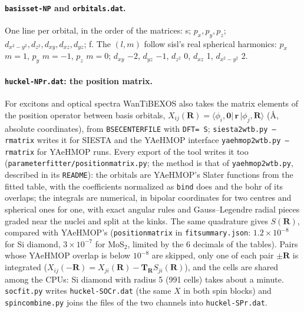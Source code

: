 \documentclass[11pt,a4paper]{article}
\newcommand{\cmd}[1]{\texttt{#1}}
\renewcommand{\_}{\origunderscore\allowbreak}
\begin{document}
\paragraph{\cmd{basis\_set-NP} and \cmd{orbitals.dat}.} One line per orbital, in the order of the matrices:
s; $p_x,p_y,p_z$; $d_{x^2-y^2},d_{z^2},d_{xy},d_{xz},d_{yz}$; f. The $(l,m)$ follow sisl's real spherical
harmonics: $p_x$ $m{=}1$, $p_y$ $m{=}{-1}$, $p_z$ $m{=}0$; $d_{xy}$ $-2$, $d_{yz}$ $-1$, $d_{z^2}$ 0, $d_{xz}$ 1,
$d_{x^2-y^2}$ 2.

\paragraph{\cmd{huckel-NP\_r.dat}: the position matrix.} For excitons and optical spectra WanTiBEXOS also takes the matrix
elements of the position operator between basis orbitals, $X_{ij}(\mathbf R)=\langle\phi_i,\mathbf 0|\,\mathbf r\,|\phi_j,\mathbf R\rangle$
(\AA, absolute coordinates), from \cmd{BSE\_CENTER\_FILE} with \cmd{DFT= S}; \cmd{siesta2wtb.py --rmatrix} writes it for SIESTA and
the YAeHMOP interface \cmd{yaehmop2wtb.py --rmatrix} for YAeHMOP runs. Every export of the tool writes it too
(\cmd{parameter\_fitter/position\_matrix.py}; the method is that of \cmd{yaehmop2wtb.py}, described in its \cmd{README}): the orbitals
are YAeHMOP's Slater functions from the fitted table, with the coefficients normalized as \cmd{bind} does and the bohr of its
overlaps; the integrals are numerical, in bipolar coordinates for two centres and spherical ones for one, with exact angular
rules and Gauss--Legendre radial pieces graded near the nuclei and split at the kinks. The same quadrature gives $S(\mathbf R)$,
compared with YAeHMOP's (\cmd{position\_matrix} in \cmd{fit\_summary.json}: $1.2\times10^{-8}$ for Si diamond, $3\times10^{-7}$ for
MoS$_2$, limited by the 6 decimals of the tables). Pairs whose YAeHMOP overlap is below $10^{-8}$ are skipped, only one of each
pair $\pm\mathbf R$ is integrated ($X_{ij}(-\mathbf R)=X_{ji}(\mathbf R)-\mathbf T_\mathbf R S_{ji}(\mathbf R)$), and the cells are
shared among the CPUs: Si diamond with radius 5 (991 cells) takes about a minute. \cmd{soc\_fit.py} writes \cmd{huckel-SOC\_r.dat}
(the same $X$ in both spin blocks) and \cmd{spin\_combine.py} joins the files of the two channels into \cmd{huckel-SP\_r.dat}.
\end{document}
